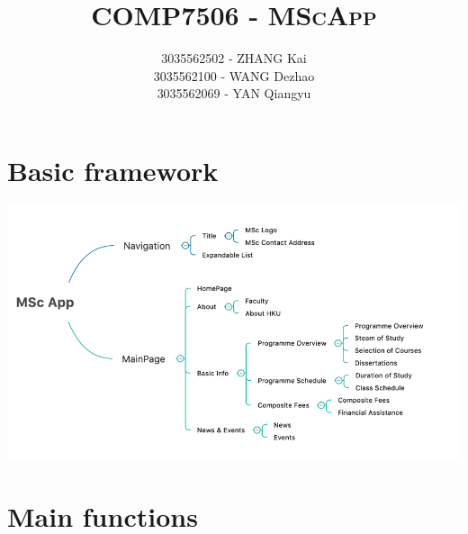\documentclass{article}
\title{\textsc{COMP7506 - MScApp}}
\author{	3035562502 - ZHANG Kai \\
                3035562100 - WANG Dezhao \\
                3035562069 - YAN Qiangyu }
\date{}
\begin{document}
    \maketitle
    
    
    \section{Basic framework}

    \begin{center}
        \includegraphics[width=5.5in]{framework}
    \end{center}

    \section{Main functions}
\end{document}
